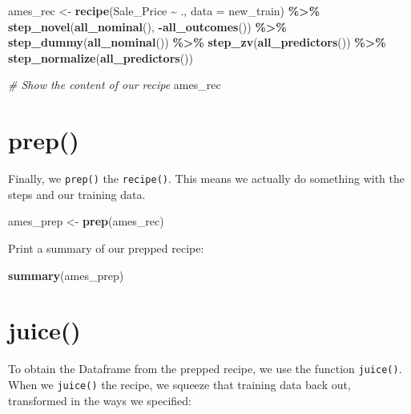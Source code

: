 \documentclass[
]{book}
\newenvironment{Shaded}{\begin{snugshade}}{\end{snugshade}}
\newcommand{\CommentTok}[1]{\textcolor[rgb]{0.56,0.35,0.01}{\textit{#1}}}
\newcommand{\DataTypeTok}[1]{\textcolor[rgb]{0.13,0.29,0.53}{#1}}
\newcommand{\KeywordTok}[1]{\textcolor[rgb]{0.13,0.29,0.53}{\textbf{#1}}}
\newcommand{\NormalTok}[1]{#1}
\newcommand{\OperatorTok}[1]{\textcolor[rgb]{0.81,0.36,0.00}{\textbf{#1}}}
\newcommand{\StringTok}[1]{\textcolor[rgb]{0.31,0.60,0.02}{#1}}
\begin{document}
\begin{Shaded}
\begin{Highlighting}[]
\NormalTok{ames\_rec \textless{}{-}}
\StringTok{  }\KeywordTok{recipe}\NormalTok{(Sale\_Price }\OperatorTok{\textasciitilde{}}\StringTok{ }\NormalTok{., }\DataTypeTok{data =}\NormalTok{ new\_train) }\OperatorTok{\%\textgreater{}\%}
\StringTok{  }\KeywordTok{step\_novel}\NormalTok{(}\KeywordTok{all\_nominal}\NormalTok{(), }\OperatorTok{{-}}\KeywordTok{all\_outcomes}\NormalTok{()) }\OperatorTok{\%\textgreater{}\%}
\StringTok{  }\KeywordTok{step\_dummy}\NormalTok{(}\KeywordTok{all\_nominal}\NormalTok{()) }\OperatorTok{\%\textgreater{}\%}
\StringTok{  }\KeywordTok{step\_zv}\NormalTok{(}\KeywordTok{all\_predictors}\NormalTok{()) }\OperatorTok{\%\textgreater{}\%}
\StringTok{  }\KeywordTok{step\_normalize}\NormalTok{(}\KeywordTok{all\_predictors}\NormalTok{())}

\CommentTok{\# Show the content of our recipe}
\NormalTok{ames\_rec}
\end{Highlighting}
\end{Shaded}

\hypertarget{prep}{%
\section{prep()}\label{prep}}

Finally, we \texttt{prep()} the \texttt{recipe()}. This means we actually do something with the steps and our training data.

\begin{Shaded}
\begin{Highlighting}[]
\NormalTok{ames\_prep \textless{}{-}}\StringTok{ }\KeywordTok{prep}\NormalTok{(ames\_rec)}
\end{Highlighting}
\end{Shaded}

Print a summary of our prepped recipe:

\begin{Shaded}
\begin{Highlighting}[]
\KeywordTok{summary}\NormalTok{(ames\_prep)}
\end{Highlighting}
\end{Shaded}

\hypertarget{juice}{%
\section{juice()}\label{juice}}

To obtain the Dataframe from the prepped recipe, we use the function \texttt{juice()}. When we \texttt{juice()} the recipe, we squeeze that training data back out, transformed in the ways we specified:
\end{document}
